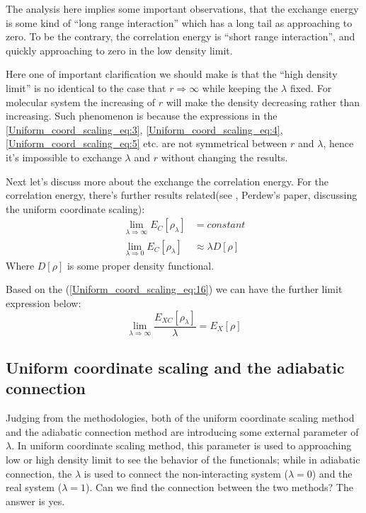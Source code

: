 The analysis here implies some important observations, that 
the exchange energy is some kind of ``long range interaction'' which
has a long tail as approaching to zero. To be the contrary, the correlation
energy is ``short range interaction'', and quickly approaching to zero in the
low density limit. 

Here one of important clarification we should make is that the ``high
density limit'' is no identical to the case that $r\Rightarrow\infty$ 
while keeping the $\lambda$ fixed. For molecular system the increasing
of $r$ will make the density decreasing rather than increasing. Such
phenomenon is because the expressions in the 
\ref{Uniform_coord_scaling_eq:3}, \ref{Uniform_coord_scaling_eq:4},
\ref{Uniform_coord_scaling_eq:5} etc. are not symmetrical between $r$
and $\lambda$, hence it's impossible to exchange $\lambda$ and $r$ without
changing the results.

Next let's discuss more about the exchange the correlation energy. For
the correlation energy, there's further results related(see
\cite{DFT_PAPERS_GATHERING}, Perdew's paper, discussing the uniform
coordinate scaling):
\begin{equation}
  \label{Uniform_coord_scaling_eq:16}
  \begin{split}
    \lim_{\lambda\Rightarrow \infty}E_{C}[\rho_{\lambda}] &= constant
    \\
    \lim_{\lambda\Rightarrow 0}E_{C}[\rho_{\lambda}] &\approx \lambda D[\rho]
  \end{split}
\end{equation}
Where $D[\rho]$ is some proper density functional.


Based on the (\ref{Uniform_coord_scaling_eq:16}) we can have the
further limit expression below:
\begin{equation}
 \label{Uniform_coord_scaling_eq:17}
\lim_{\lambda\Rightarrow \infty}\frac{E_{XC}[\rho_{\lambda}]}{\lambda} = 
E_{X}[\rho]
\end{equation}


\subsection{Uniform coordinate scaling and the adiabatic connection}
\label{sec:uniform_scaling_adibatic_connection}

Judging from the methodologies, both of the uniform coordinate scaling method
and the adiabatic connection method are introducing some external parameter of
$\lambda$. In uniform coordinate scaling method, this parameter is used to
approaching low or high density limit to see the behavior of the functionals;
while in adiabatic connection, the $\lambda$ is used to connect the
non-interacting system ($\lambda = 0$) and the real system ($\lambda = 1$).
Can we find the connection between the two methods? The answer is yes.

